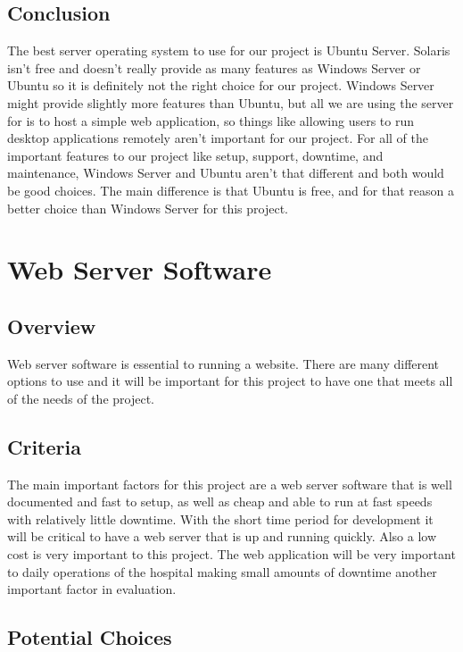 \documentclass[onecolumn, draftclsnofoot,10pt, compsoc]{IEEEtran}
\begin{document}
\subsection{Conclusion}
The best server operating system to use for our project is Ubuntu Server. Solaris isn't free and doesn't really provide as many features as Windows Server or Ubuntu so it is definitely not the right choice for our project. Windows Server might provide slightly more features than Ubuntu, but all we are using the server for is to host a simple web application, so things like allowing users to run desktop applications remotely aren't important for our project. For all of the important features to our project like setup, support, downtime, and maintenance, Windows Server and Ubuntu aren't that different and both would be good choices. The main difference is that Ubuntu is free, and for that reason a better choice than Windows Server for this project.

\section{Web Server Software}

\subsection{Overview}
Web server software is essential to running a website. There are many different options to use and it will be important for this project to have one that meets all of the needs of the project.
\subsection{Criteria}
The main important factors for this project are a web server software that is well documented and fast to setup, as well as cheap and able to run at fast speeds with relatively little downtime. With the short time period for development it will be critical to have a web server that is up and running quickly. Also a low cost is very important to this project. The web application will be very important to daily operations of the hospital making small amounts of downtime another important factor in evaluation.
\subsection{Potential Choices}
\end{document}
